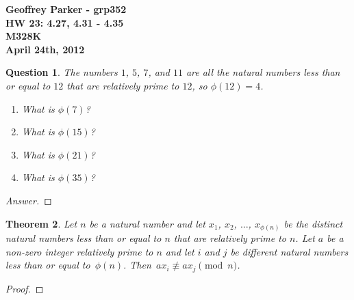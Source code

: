 \documentclass[12pt,leqno]{article}
\numberwithin{equation}{section}
\newtheorem{thm}{Theorem}[section]
\newtheorem{ques}[thm]{Question}
\theoremstyle{definition}
\begin{document}
\thispagestyle{plain}
\begin{flushright}
\large{\textbf{Geoffrey Parker - grp352 \\
HW 23: 4.27, 4.31 - 4.35\\
M328K \\
April 24th, 2012 \\}}
\end{flushright}

\markboth{}{} \setcounter{section}{0} \baselineskip=18pt

\setcounter{tocdepth}{4}



\setcounter{section}{4}

\setcounter{thm}{26}

\begin{ques}
The numbers $1$, $5$, $7$, and $11$ are all the natural numbers less
than or equal to $12$ that are relatively prime to $12$, so
$\phi(12) = 4$.
\begin{enumerate}
\item What is $\phi(7)$?
\item What is $\phi(15)$?
\item What is $\phi(21)$?
\item What is $\phi(35)$?
\end{enumerate}
\end{ques}
\begin{proof}[Answer]
\end{proof}

\setcounter{thm}{30}

\begin{thm}
Let $n$ be a natural number and let $x_1$, $x_2$, $\hdots$,
$x_{\phi(n)}$ be the distinct natural numbers less than or equal to
$n$ that are relatively prime to $n$.  Let $a$ be a non-zero integer
relatively prime to $n$ and let $i$ and $j$ be different natural
numbers less than or equal to~$\phi(n)$.  Then~$ax_i \not \equiv
ax_j \pmod{n}$.
\end{thm}
\begin{proof}[Proof]
\end{proof}
\end{document}
